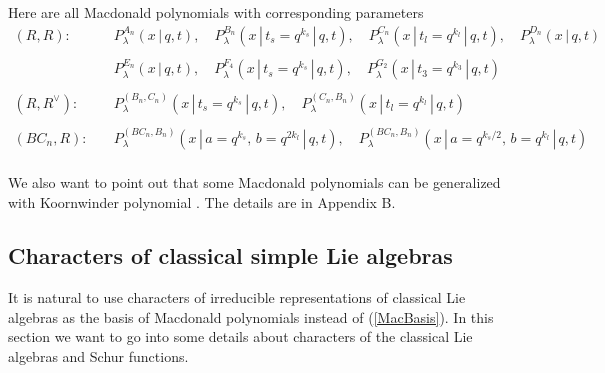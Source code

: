 \documentclass{article}
\begin{document}
Here are all Macdonald polynomials with corresponding parameters
\begin{equation}
    \begin{array}{ll}
    (R,R):\quad  &  P_{\lambda}^{A_n} \left( x\,|\, q,t \right), \quad P_{\lambda}^{B_n} \left( x\,|\,t_s = q^{k_s} \,|\, q,t \right), \quad  P_{\lambda}^{C_n} \left( x\,|\,t_l = q^{k_l} \,|\, q,t \right), \quad  P_{\lambda}^{D_n} \left( x \,|\, q,t \right)  \\
    &\\
    & P_{\lambda}^{E_n}  \left( x\,|\, q,t \right),\quad  P_{\lambda}^{F_4} \left( x\,|\,t_s = q^{k_s} \,|\, q,t \right), \quad  P_{\lambda}^{G_2} \left( x\,|\,t_3 = q^{k_3} \,|\, q,t \right) \\
    &\\
     (R,R^{\vee}):\quad & P_{\lambda}^{(B_n,C_n)} \left( x\,|\,t_s = q^{k_s}\,|\, q,t \right), \quad P_{\lambda}^{(C_n,B_n)} \left( x\,|\,t_l = q^{k_l} \,|\, q,t \right) \\
     &\\
     (BC_n,R): \quad & P_{\lambda}^{(BC_n,B_n)} \left( x\,|\,a = q^{k_s},\, b = q^{2 k_l} \,|\, q,t \right), \quad P_{\lambda}^{(BC_n,B_n)} \left( x\,|\,a = q^{k_s/2},\, b = q^{k_l} \,|\, q,t \right) \\
    \end{array}
    \label{admissible pairs}
\end{equation}

We also want to point out that some Macdonald polynomials can be generalized with Koornwinder polynomial \cite{Koorn}. The details are in Appendix B.

\subsection{Characters of classical simple Lie algebras \label{SchursSection} }
It is natural to use characters of irreducible representations of classical Lie algebras as the basis of Macdonald polynomials  instead of (\ref{MacBasis}). In this section we want to go into some details about characters of the classical Lie algebras and Schur functions.
\end{document}
